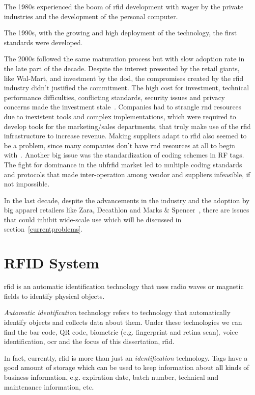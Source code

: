 The 1980s experienced the boom of \ac{rfid} development with wager by the private industries and the development of the personal computer.

The 1990s, with the growing and high deployment of the technology, the first standards were developed. 

The 2000s followed the same maturation process but with slow adoption rate in the late part of the decade. 
Despite the interest presented by the retail giants, like Wal-Mart, and investment by the \ac{dod}, the compromises created by the \ac{rfid} industry didn't justified the commitment. The high cost for investment, technical performance difficulties, conflicting standards, security issues and privacy concerns made the investment stale~\cite{RFIDAdoptionStalls}. 
Companies had to strangle \ac{rnd} resources due to inexistent tools and complex implementations, which were required to develop tools for the marketing/sales departments, that truly make use of the \ac{rfid} infrastructure to increase revenue.
Making suppliers adapt to \ac{rfid} also seemed to be a problem, since many companies don't have \ac{rnd} resources at all to begin with~\cite{gaudinSuppliersGainFailed2008}.
Another big issue was the standardization of coding schemes in RF tags. The fight for dominance in the \ac{uhfrfid} market led to multiple coding standards and protocols that made inter-operation among vendor and suppliers infeasible, if not impossible.

In the last decade, despite the advancements in the industry and the adoption by big apparel retailers like Zara, Decathlon and Marks \& Spencer~\cite{RFIDRetailApparel}, there are issues that could inhibit wide-scale use which will be discussed in section~\ref{currentproblems}.

\section{RFID System}

\ac{rfid} is an automatic identification technology that uses radio waves or magnetic fields to identify physical objects.

\emph{Automatic identification} technology refers to technology that automatically identify objects and collects data about them.
Under these technologies we can find the bar code, QR code, biometric (e.g. fingerprint and retina scan), voice identification, \ac{ocr} and the focus of this dissertation, \acl{rfid}. 

In fact, currently, \ac{rfid} is more than just an \emph{identification} technology. Tags have a good amount of storage which can be used to keep information about all kinds of business information, e.g. expiration date, batch number, technical and maintenance information, etc.

